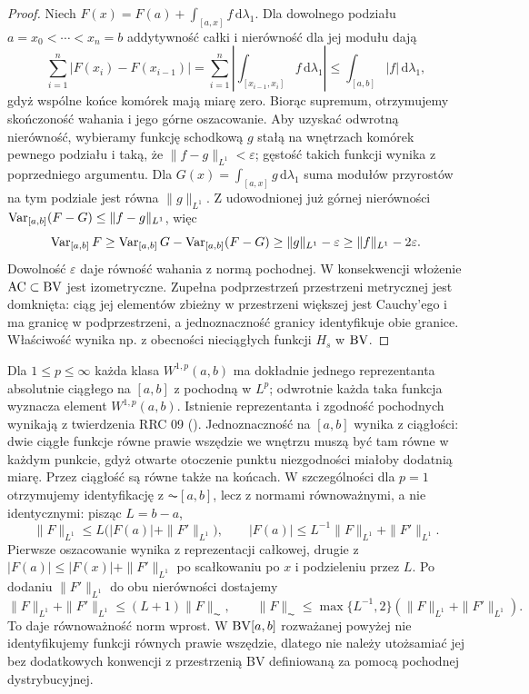 \begin{proof}
Niech $F(x)=F(a)+\int_{[a,x]}f\,\mathrm d\lambda_1$.
Dla dowolnego podziału $a=x_0<\cdots<x_n=b$
addytywność całki i nierówność dla jej modułu dają
\[
 \sum_{i=1}^n |F(x_i)-F(x_{i-1})|
 =\sum_{i=1}^n\left|\int_{[x_{i-1},x_i]}f\,\mathrm d\lambda_1\right|
 \le\int_{[a,b]}|f|\,\mathrm d\lambda_1,
\]
gdyż wspólne końce komórek mają miarę zero.
Biorąc supremum, otrzymujemy skończoność wahania
i jego górne oszacowanie.
Aby uzyskać odwrotną nierówność, wybieramy funkcję
schodkową $g$ stałą na wnętrzach komórek pewnego podziału
i taką, że $\|f-g\|_{L^1}<\varepsilon$; gęstość takich
funkcji wynika z poprzedniego argumentu.
Dla $G(x)=\int_{[a,x]}g\,\mathrm d\lambda_1$
suma modułów przyrostów na tym podziale jest równa
$\|g\|_{L^1}$. Z udowodnionej już górnej nierówności
$\operatorname{Var}_{[a,b]}(F-G)\le\|f-g\|_{L^1}$, więc
\[
 \operatorname{Var}_{[a,b]}F\ge\operatorname{Var}_{[a,b]}G-\operatorname{Var}_{[a,b]}(F-G)
 \ge\|g\|_{L^1}-\varepsilon
 \ge\|f\|_{L^1}-2\varepsilon.
\]
Dowolność $\varepsilon$ daje równość wahania z normą
pochodnej. W konsekwencji włożenie $\mathrm{AC}\subset\mathrm{BV}$
jest izometryczne. Zupełna podprzestrzeń przestrzeni
metrycznej jest domknięta: ciąg jej elementów zbieżny
w przestrzeni większej jest Cauchy'ego i ma granicę
w podprzestrzeni, a jednoznaczność granicy identyfikuje
obie granice. Właściwość wynika np. z obecności
nieciągłych funkcji $H_s$ w $\mathrm{BV}$.
\end{proof}

\begin{uwaga}
Dla $1\le p\le\infty$ każda klasa $W^{1,p}(a,b)$
ma dokładnie jednego reprezentanta absolutnie ciągłego
na $[a,b]$ z pochodną w $L^p$; odwrotnie każda taka
funkcja wyznacza element $W^{1,p}(a,b)$.
Istnienie reprezentanta i zgodność pochodnych
wynikają z twierdzenia RRC 09
().
Jednoznaczność na $[a,b]$ wynika z ciągłości:
dwie ciągłe funkcje równe prawie wszędzie we wnętrzu
muszą być tam równe w każdym punkcie, gdyż otwarte
otoczenie punktu niezgodności miałoby dodatnią miarę.
Przez ciągłość są równe także na końcach.
W szczególności dla $p=1$ otrzymujemy identyfikację
z $\AC[a,b]$, lecz z normami równoważnymi, a nie
identycznymi: pisząc $L=b-a$,
\[
 \|F\|_{L^1}\le L\bigl(|F(a)|+\|F'\|_{L^1}\bigr),
 \qquad
 |F(a)|\le L^{-1}\|F\|_{L^1}+\|F'\|_{L^1}.
\]
Pierwsze oszacowanie wynika z reprezentacji całkowej,
drugie z $|F(a)|\le |F(x)|+\|F'\|_{L^1}$ po
scałkowaniu po $x$ i podzieleniu przez $L$. Po dodaniu
$\|F'\|_{L^1}$ do obu nierówności dostajemy
\[
 \|F\|_{L^1}+\|F'\|_{L^1}\le(L+1)\|F\|_{\AC},
 \qquad \|F\|_{\AC}\le\max\{L^{-1},2\}
 (\|F\|_{L^1}+\|F'\|_{L^1}).
\]
To daje równoważność norm wprost.
W $\mathrm{BV}[a,b]$ rozważanej powyżej nie identyfikujemy
funkcji równych prawie wszędzie, dlatego nie należy
utożsamiać jej bez dodatkowych konwencji z przestrzenią
BV definiowaną za pomocą pochodnej dystrybucyjnej.
\end{uwaga}

